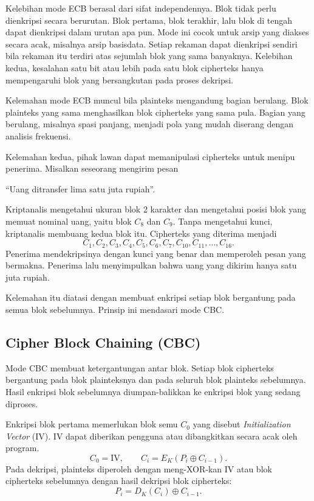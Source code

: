 Kelebihan mode ECB berasal dari sifat independennya. Blok tidak perlu
dienkripsi secara berurutan. Blok pertama, blok terakhir, lalu blok di tengah
dapat dienkripsi dalam urutan apa pun. Mode ini cocok untuk arsip yang diakses
secara acak, misalnya arsip basisdata. Setiap rekaman dapat dienkripsi sendiri
bila rekaman itu terdiri atas sejumlah blok yang sama banyaknya. Kelebihan
kedua, kesalahan satu bit atau lebih pada satu blok cipherteks hanya
mempengaruhi blok yang bersangkutan pada proses dekripsi.

Kelemahan mode ECB muncul bila plainteks mengandung bagian berulang. Blok
plainteks yang sama menghasilkan blok cipherteks yang sama pula. Bagian yang
berulang, misalnya spasi panjang, menjadi pola yang mudah diserang dengan
analisis frekuensi.

Kelemahan kedua, pihak lawan dapat memanipulasi cipherteks untuk menipu
penerima. Misalkan seseorang mengirim pesan
\begin{center}
``Uang ditransfer lima satu juta rupiah''.
\end{center}
Kriptanalis mengetahui ukuran blok 2 karakter dan mengetahui posisi blok yang
memuat nominal uang, yaitu blok $C_8$ dan $C_9$. Tanpa mengetahui kunci,
kriptanalis membuang kedua blok itu. Cipherteks yang diterima menjadi
\[
C_1, C_2, C_3, C_4, C_5, C_6, C_7, C_{10}, C_{11}, \dots, C_{16}.
\]
Penerima mendekripsinya dengan kunci yang benar dan memperoleh pesan yang
bermakna. Penerima lalu menyimpulkan bahwa uang yang dikirim hanya satu juta
rupiah.

Kelemahan itu diatasi dengan membuat enkripsi setiap blok bergantung pada semua
blok sebelumnya. Prinsip ini mendasari mode CBC.

\subsection{Cipher Block Chaining (CBC)}

Mode CBC membuat ketergantungan antar blok. Setiap blok cipherteks bergantung
pada blok plainteksnya dan pada seluruh blok plainteks sebelumnya. Hasil
enkripsi blok sebelumnya diumpan-balikkan ke enkripsi blok yang sedang
diproses.

Enkripsi blok pertama memerlukan blok semu $C_0$ yang disebut
\textit{Initialization Vector} (IV). IV dapat diberikan pengguna atau
dibangkitkan secara acak oleh program.
\begin{equation}
C_0 = \mathrm{IV}, \qquad C_i = E_K(P_i \oplus C_{i-1}).
\label{eq:cbc-enkripsi}
\end{equation}
Pada dekripsi, plainteks diperoleh dengan meng-XOR-kan IV atau blok cipherteks
sebelumnya dengan hasil dekripsi blok cipherteks:
\begin{equation}
P_i = D_K(C_i) \oplus C_{i-1}.
\label{eq:cbc-dekripsi}
\end{equation}

